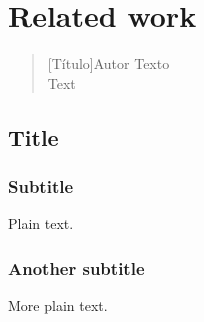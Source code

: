 \chapter{Related work}

\begin{quotation}[Título]{Autor}
Texto \\
Text
\end{quotation}

\section{Title}

\subsection{Subtitle}

Plain text.

\subsection{Another subtitle}

More plain text.

